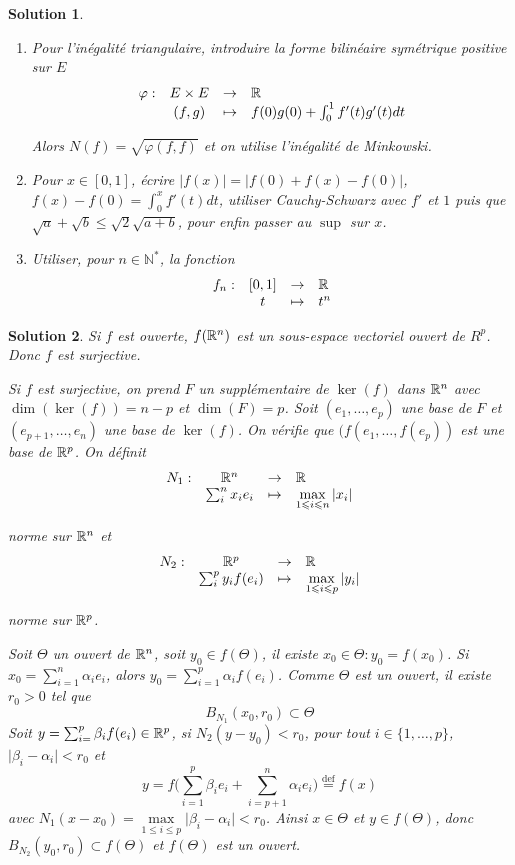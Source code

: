 \documentclass[12pt]{article}
\newtheorem{solution}{Solution}[section]
\theoremstyle{remark}
\newcommand{\N}{\mathbb{N}} \newcommand{\Z}{\mathbb{Z}}
\newcommand{\function}[5]{
	$$
	\begin{array}{rccl}
		#1: & #2 & \to & #3 \\
		& #4 & \mapsto & #5
	\end{array}
	$$
}
\begin{document}
\begin{solution}
	\phantom{}
	\begin{enumerate}
		\item Pour l'inégalité triangulaire, introduire la forme bilinéaire symétrique positive sur $E$ \function{\varphi}{E\times E}{\R}{(f,g)}{f(0)g(0)+\int_{0}^{1}f'(t)g'(t)dt}
		Alors $N(f)=\sqrt{\varphi(f,f)}$ et on utilise l'inégalité de Minkowski.
		\item Pour $x\in[0,1]$, écrire $\vert f(x)\vert=\vert f(0)+f(x)-f(0)\vert$, $f(x)-f(0)=\int_{0}^{x}f'(t)dt$, utiliser Cauchy-Schwarz avec $f'$ et $1$ puis que $\sqrt{a}+\sqrt{b}\leqslant\sqrt{2}\sqrt{a+b}$, pour enfin passer au $\sup$ sur $x$.
		\item Utiliser, pour $n\in\N^{*}$, la fonction \function{f_n}{[0,1]}{\R}{t}{t^n}
	\end{enumerate}
\end{solution}

\begin{solution}
	Si $f$ est ouverte, $f(\mathbb{R}^{n})$ est un sous-espace vectoriel ouvert de $R^{p}$. Donc $f$ est surjective.

	Si $f$ est surjective, on prend $F$ un supplémentaire de $\ker(f)$ dans $\mathbb{R}^{n}$ avec $\dim(\ker(f))=n-p$ et $\dim(F)=p$. Soit $(e_{1},\dots,e_{p})$ une base de $F$ et $(e_{p+1},\dots,e_{n})$ une base de $\ker(f)$. On vérifie que $(f(e_{1},\dots,f(e_{p}))$ est une base de $\mathbb{R}^{p}$. On définit \function{N_1}{\R^n}{\R}{\sum_{i}^{n}x_{i}e_{i}}{\max\limits_{1\leqslant i\leqslant n}\vert x_{i}\vert}
	norme sur $\mathbb{R}^{n}$ et \function{N_2}{\R^p}{\R}{\sum_{i}^{p}y_{i}f(e_{i})}{\max\limits_{1\leqslant i\leqslant p}\vert y_{i}\vert}
	norme sur $\mathbb{R}^{p}$.

	Soit $\Theta$ un ouvert de $\mathbb{R}^{n}$, soit $y_{0}\in f(\Theta)$, il existe $x_{0}\in\Theta\colon y_{0}=f(x_{0})$. Si $x_{0}=\sum_{i=1}^{n}\alpha_{i}e_{i}$, alors $y_{0}=\sum_{i=1}^{p}\alpha_{i}f(e_{i})$. Comme $\Theta$ est un ouvert, il existe $r_{0}>0$ tel que 
	$$B_{N_{1}}(x_{0},r_{0})\subset\Theta$$
	Soit $y=\sum_{i=}^{p}\beta_{i}f(e_{i})\in\mathbb{R}^{p}$, si $N_{2}(y-y_{0})<r_{0}$, pour tout $i\in\{1,\dots,p\}$, $\vert\beta_{i}-\alpha_{i}\vert<r_{0}$ et 
	$$y=f\Biggl(\sum_{i=1}^{p}\beta_{i}e_{i}+\sum_{i=p+1}^{n}\alpha_{i}e_{i}\Biggr)\overset{\text{def}}{=}f(x)$$
	avec $N_{1}(x-x_{0})=\max\limits_{1\leqslant i\leqslant p}\vert\beta_{i}-\alpha_{i}\vert<r_{0}$. Ainsi $x\in\Theta$ et $y\in f(\Theta)$, donc $B_{N_{2}}(y_{0},r_{0})\subset f(\Theta)$ et $f(\Theta)$ est un ouvert.
\end{solution}
\end{document}
